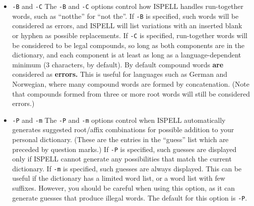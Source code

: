 \begin{itemize}
\begin{verbatim}
   \chapter {This is a Ckapter} \cite{SCH86}
\end{verbatim}

ISPELL will find \verb+Ckapter+ but not \verb+SCH+\@.
The \verb+-t+ option does not recognize the \TeX\ comment character \verb+%+,
so comments are also spell-checked.
It also assumes correct \LaTeX\ syntax.
Arguments to infrequently used commands and some optional arguments are
sometimes checked unnecessarily.

References for the \verb+tib+ bibliography system, that is, text between a
``[.'' or ``$<$.'' and ``.]'' or ``.$>$'' will always be ignored in \TeX /\LaTeX\
mode.

\item {\Large\tt -B} and {\Large\tt -C} \sunspec{\\}{}
The \verb+-B+ and \verb+-C+ options control how ISPELL handles run-together
words, such as ``notthe'' for ``not the''\@.
If \verb+-B+ is specified, such words will be considered as errors, and
ISPELL will list variations with an inserted blank or hyphen as possible
replacements.
If \verb+-C+ is specified, run-together words will be considered to be legal
compounds, so long as both components are in the dictionary, and each component
is at least as long as a language-dependent minimum (3 characters, by default).
By default compound words {\bf are} considered as {\bf errors.}
This is useful for languages such as German and Norwegian, where many compound
words are formed by concatenation.
(Note that compounds formed from three or more root words will still be
considered errors.)

\item {\Large\tt -P} and {\Large\tt -m} \sunspec{\\}{}
The \verb+-P+ and \verb+-m+ options control when ISPELL automatically generates
suggested root/affix combinations for possible addition to your personal
dictionary.
(These are the entries in the ``guess'' list which are preceded by question
marks.)
If \verb+-P+ is specified, such guesses are displayed only if ISPELL
cannot generate any possibilities that match the current dictionary.
If \verb+-m+ is specified, such guesses are always displayed.
This can be useful if the dictionary has a limited word list, or a word list
with few suffixes.
However, you should be careful when using this option, as it can generate
guesses that produce illegal words.
The default for this option is \verb+-P+\@.


\end{itemize}
